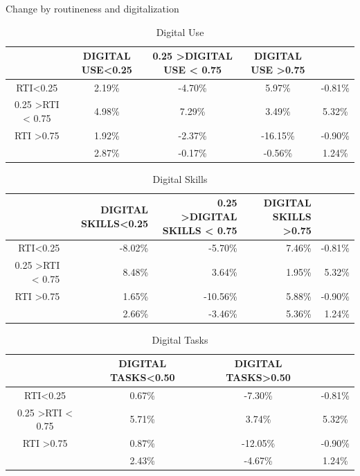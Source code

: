 \documentclass[10pt,xcolor={usenames,dvipsnames}]{beamer}
\begin{document}
\begin{frame}{Change by routineness and digitalization }
\tiny
\begin{table}[htbp]
  \centering
  \caption{Digital Use}
    \begin{tabular}{c|ccc|c}
          & DIGITAL USE<0.25 & 0.25 >DIGITAL USE < 0.75 & DIGITAL USE >0.75 &  \\
    \midrule
    RTI<0.25 & 2.19\% & -4.70\% & 5.97\% & -0.81\% \\
    0.25 >RTI < 0.75 & 4.98\% & 7.29\% & 3.49\% & 5.32\% \\
    RTI >0.75 & 1.92\% & -2.37\% & -16.15\% & -0.90\% \\
    \midrule
          & 2.87\% & -0.17\% & -0.56\% & 1.24\% \\
    \end{tabular}%
\end{table}%
\tiny
\begin{table}[htbp]
  \centering
  \caption{Digital Skills}
    \begin{tabular}{r|rrr|r}
          & DIGITAL SKILLS<0.25 & 0.25 >DIGITAL SKILLS < 0.75 & DIGITAL SKILLS >0.75 &  \\
    \midrule
    RTI<0.25 & -8.02\% & -5.70\% & 7.46\% & -0.81\% \\
    0.25 >RTI < 0.75 & 8.48\% & 3.64\% & 1.95\% & 5.32\% \\
    RTI >0.75 & 1.65\% & -10.56\% & 5.88\% & -0.90\% \\
    \midrule
          & 2.66\% & -3.46\% & 5.36\% & 1.24\% \\
    \end{tabular}%
  \label{tab:addlabel}%
\end{table}%

\tiny
\begin{table}[htbp]
  \centering
  \caption{Digital Tasks}
    \begin{tabular}{c|cc|c}
          & DIGITAL TASKS<0.50 & DIGITAL TASKS>0.50 &  \\
    \midrule
    RTI<0.25 & 0.67\% & -7.30\% & -0.81\% \\
    0.25 >RTI < 0.75 & 5.71\% & 3.74\% & 5.32\% \\
    RTI >0.75 & 0.87\% & -12.05\% & -0.90\% \\
    \midrule
          & 2.43\% & -4.67\% & 1.24\% \\
    \end{tabular}%
\end{table}%


\end{frame}
\end{document}
